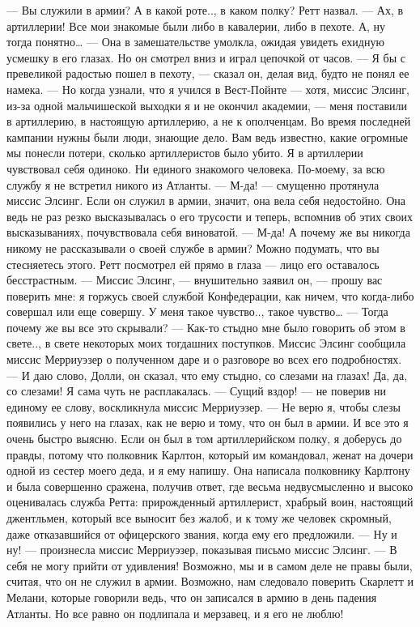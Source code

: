 — Вы служили в армии? А в какой роте.., в каком полку? Ретт назвал.
— Ах, в артиллерии! Все мои знакомые были либо в кавалерии, либо в пехоте. А, ну тогда понятно… — Она в замешательстве умолкла, ожидая увидеть ехидную усмешку в его глазах. Но он смотрел вниз и играл цепочкой от часов. — Я бы с превеликой радостью пошел в пехоту, — сказал он, делая вид, будто не понял ее намека. — Но когда узнали, что я учился в Вест-Пойнте — хотя, миссис Элсинг, из-за одной мальчишеской выходки я и не окончил академии, — меня поставили в артиллерию, в настоящую артиллерию, а не к ополченцам. Во время последней кампании нужны были люди, знающие дело. Вам ведь известно, какие огромные мы понесли потери, сколько артиллеристов было убито. Я в артиллерии чувствовал себя одиноко. Ни единого знакомого человека. По-моему, за всю службу я не встретил никого из Атланты.
— М-да! — смущенно протянула миссис Элсинг. Если он служил в армии, значит, она вела себя недостойно. Она ведь не раз резко высказывалась о его трусости и теперь, вспомнив об этих своих высказываниях, почувствовала себя виноватой. — М-да! А почему же вы никогда никому не рассказывали о своей службе в армии? Можно подумать, что вы стесняетесь этого.
Ретт посмотрел ей прямо в глаза — лицо его оставалось бесстрастным.
— Миссис Элсинг, — внушительно заявил он, — прошу вас поверить мне: я горжусь своей службой Конфедерации, как ничем, что когда-либо совершал или еще совершу. У меня такое чувство.., такое чувство…
— Тогда почему же вы все это скрывали?
— Как-то стыдно мне было говорить об этом в свете.., в свете некоторых моих тогдашних поступков. Миссис Элсинг сообщила миссис Мерриуэзер о полученном даре и о разговоре во всех его подробностях.
— И даю слово, Долли, он сказал, что ему стыдно, со слезами на глазах! Да, да, со слезами! Я сама чуть не расплакалась.
— Сущий вздор! — не поверив ни единому ее слову, воскликнула миссис Мерриуэзер. — Не верю я, чтобы слезы появились у него на глазах, как не верю и тому, что он был в армии. И все это я очень быстро выясню. Если он был в том артиллерийском полку, я доберусь до правды, потому что полковник Карлтон, который им командовал, женат на дочери одной из сестер моего деда, и я ему напишу.
Она написала полковнику Карлтону и была совершенно сражена, получив ответ, где весьма недвусмысленно и высоко оценивалась служба Ретта: прирожденный артиллерист, храбрый воин, настоящий джентльмен, который все выносит без жалоб, и к тому же человек скромный, даже отказавшийся от офицерского звания, когда ему его предложили.
— Ну и ну! — произнесла миссис Мерриуэзер, показывая письмо миссис Элсинг. — В себя не могу прийти от удивления! Возможно, мы и в самом деле не правы были, считая, что он не служил в армии. Возможно, нам следовало поверить Скарлетт и Мелани, которые говорили ведь, что он записался в армию в день падения Атланты. Но все равно он подлипала и мерзавец, и я его не люблю!
